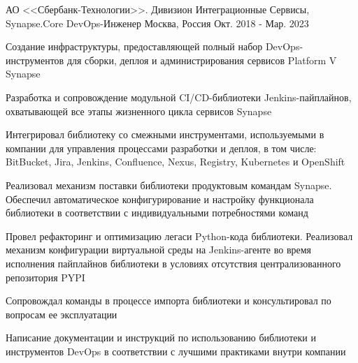 

\begin{cventries}

  \cventry
  {АО <<Сбербанк-Технологии>>. Дивизион Интеграционные Сервисы, Synapse.Core} %
  {DevOps-Инженер} %
  {Москва, Россия} %
  {Окт. 2018 - Мар. 2023} %
  {
    \begin{cvitems} %
      \item {Создание инфраструктуры, предоставляющей полный набор DevOps-инструментов для сборки, деплоя и администрирования сервисов Platform V Synapse}
      \item {Разработка и сопровождение модульной CI/CD-библиотеки Jenkins-пайплайнов, охватывающей все этапы жизненного цикла сервисов Synapse}
      \item {Интегрировал библиотеку со смежными инструментами, используемыми в компании для управления процессами разработки и деплоя, в том числе: BitBucket, Jira, Jenkins, Confluence, Nexus, Registry, Kubernetes и OpenShift}
      \item {Реализовал механизм поставки библиотеки продуктовым командам Synapse. Обеспечил автоматическое конфигурирование и настройку функционала библиотеки в соответствии с индивидуальными потребностями команд}
      \item {Провел рефакторинг и оптимизацию легаси Python-кода библиотеки. Реализовал механизм конфигурации виртуальной среды на Jenkins-агенте во время исполнения пайплайнов библиотеки в условиях отсутствия централизованного репозитория PYPI}
      \item {Сопровождал команды в процессе импорта библиотеки и консультировал по вопросам ее эксплуатации}
      \item {Написание документации и инструкций по использованию библиотеки и инструментов DevOps в соответствии с лучшими практиками внутри компании}
    \end{cvitems}
  }
\end{cventries}


